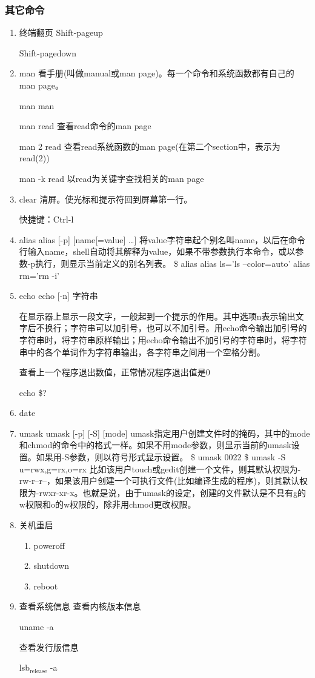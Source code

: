 \documentclass[11pt]{article}
\begin{document}
\subsubsection{其它命令}
\label{sec-1-1-13}
\begin{enumerate}
\item 终端翻页
\label{sec-1-1-13-1}
Shift-pageup

Shift-pagedown

\item man
\label{sec-1-1-13-2}
看手册(叫做manual或man page)。每一个命令和系统函数都有自己的man page。 

man man

man read  查看read命令的man page

man 2 read  查看read系统函数的man page(在第二个section中，表示为read(2))

man -k read  以read为关键字查找相关的man page

\item clear
\label{sec-1-1-13-3}
清屏。使光标和提示符回到屏幕第一行。

快捷键：Ctrl-l
\item alias
\label{sec-1-1-13-4}
alias [-p] [name[=value] \ldots{}]
将value字符串起个别名叫name，以后在命令行输入name，shell自动将其解释为value，如果不带参数执行本命令，或以参数-p执行，则显示当前定义的别名列表。 
\$ alias
alias ls='ls --color=auto'
alias rm='rm -i'
\item echo
\label{sec-1-1-13-5}
echo [-n] 字符串

在显示器上显示一段文字，一般起到一个提示的作用。其中选项n表示输出文字后不换行；字符串可以加引号，也可以不加引号。用echo命令输出加引号的字符串时，将字符串原样输出；用echo命令输出不加引号的字符串时，将字符串中的各个单词作为字符串输出，各字符串之间用一个空格分割。 

查看上一个程序退出数值，正常情况程序退出值是0

echo \$?

\item date
\label{sec-1-1-13-6}
\item umask
\label{sec-1-1-13-7}
umask [-p] [-S] [mode]
umask指定用户创建文件时的掩码，其中的mode和chmod的命令中的格式一样。如果不用mode参数，则显示当前的umask设置。如果用-S参数，则以符号形式显示设置。 
\$ umask
0022
\$ umask -S
u=rwx,g=rx,o=rx
比如该用户touch或gedit创建一个文件，则其默认权限为-rw-r--r--，如果该用户创建一个可执行文件(比如编译生成的程序)，则其默认权限为-rwxr-xr-x。也就是说，由于umask的设定，创建的文件默认是不具有g的w权限和o的w权限的，除非用chmod更改权限。 
\item 关机重启
\label{sec-1-1-13-8}
\begin{enumerate}
\item poweroff
\label{sec-1-1-13-8-1}
\item shutdown
\label{sec-1-1-13-8-2}
\item reboot
\label{sec-1-1-13-8-3}
\end{enumerate}
\item 查看系统信息
\label{sec-1-1-13-9}
查看内核版本信息

uname -a

查看发行版信息

lsb$_{\text{release}}$ -a
\end{enumerate}
\end{document}
